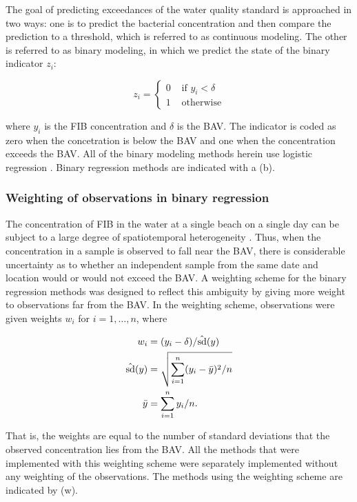 \documentclass[authoryear,review, 12pt]{elsarticle}
\begin{document}
The goal of predicting exceedances of the water quality standard is
approached in two ways: one is to predict the bacterial concentration
and then compare the prediction to a threshold, which is referred to as
continuous modeling. The other is referred to as binary modeling, in
which we predict the state of the binary indicator \(z_{i}\):

\[ z_{i}=\left\{ \begin{array}{cl}
0 & \text{ if } y_{i} < \delta\\
1 & \text{ otherwise}
\end{array}\right. \]

where \(y_i\) is the FIB concentration and \(\delta\) is the BAV. The
indicator is coded as zero when the concetration is below the BAV and
one when the concentration exceeds the BAV. All of the binary modeling
methods herein use logistic regression \citep{Hosmer-Lemeshow-2004}.
Binary regression methods are indicated with a (b).

\subsubsection{Weighting of observations in binary
regression}\label{weighting-of-observations-in-binary-regression}

The concentration of FIB in the water at a single beach on a single day
can be subject to a large degree of spatiotemporal heterogeneity
\citep{Whitman:2004pc}. Thus, when the concentration in a sample is
observed to fall near the BAV, there is considerable uncertainty as to
whether an independent sample from the same date and location would or
would not exceed the BAV. A weighting scheme for the binary regression
methods was designed to reflect this ambiguity by giving more weight
to observations far from the BAV. In the weighting scheme, observations
were given weights \(w_i\) for \(i=1,\dots,n\), where

\[
    \begin{aligned}
        w_i &= (y_i - \delta) / \hat{\rm{sd}}(y)\\
        \hat{\rm{sd}}(y) &= \sqrt{\sum_{i=1}^n (y_i - \bar{y})^2 / n}\\
        \bar{y} &= \sum_{i=1}^n y_i / n.
    \end{aligned}
\]

That is, the weights are equal to the number of standard deviations that
the observed concentration lies from the BAV. All the methods that
were implemented with this weighting scheme were separately implemented
without any weighting of the observations. The methods using the
weighting scheme are indicated by (w).
\end{document}
